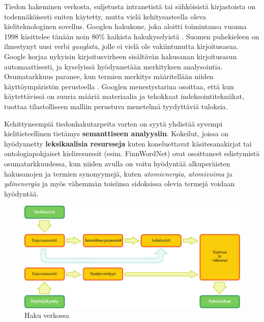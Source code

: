 \begin{multicols}{2}
Tiedon hakeminen verkosta, suljetusta intranetistä tai sähköisistä kirjastoista on todennäköisesti eniten käytetty, mutta vielä kehitysasteella oleva kieliteknologinen sovellus. Googlen hakukone, joka aloitti toimintansa vuonna 1998 käsittelee tänään noin 80\% kaikista hakukyselyistä \cite{spi1}. Suomen puhekieleen on ilmestynyt uusi verbi \textit{guuglata}, jolle ei vielä ole vakiintunutta kirjoitusasua. Google korjaa nykyisin kirjoitusvirheen sisältävän hakusanan kirjoitusasun automaattisesti, ja kyselyissä hyödynnetään merkityksen analysointia. Osumatarkkuus paranee, kun termien merkitys määritellään niiden käyttöympäristön perusteella \cite{Google-rolls}.  Googlen menestystarina osoittaa, että kun käytettävissä on suuria määriä materiaalia ja tehokkaat indeksointitekniikat, tuottaa tilastolliseen malliin perustuva menetelmä tyydyttäviä tuloksia.

Kehittyneempiä tiedonhakutarpeita varten on syytä yhdistää syvempi kielitieteellinen tietämys \textbf{semanttiseen analyysiin}.  Kokeilut, joissa on hyödynnetty \textbf{leksikaalisia resursseja} kuten koneluettavat käsitesanakirjat tai ontologiapohjaiset kieliresurssit (esim. FinnWordNet) ovat osoittaneet edistymistä osumatarkkuudessa, kun niiden avulla on voitu hyödyntää alkuperäisten hakusanojen ja termien synonyymejä, kuten \textit{atomienergia}, \textit{atomivoima} ja \textit{ydinenergia} ja myös vähemmän toisiinsa sidoksissa olevia termejä voidaan hyödyntää.

\begin{figure}[htb]
  \center
  \includegraphics[width=\textwidth]{../_media/finnish/web_search_architecture}
  \caption{Haku verkossa}
  \label{fig:websearcharch-fin}
 \end{figure}



\end{multicols}
